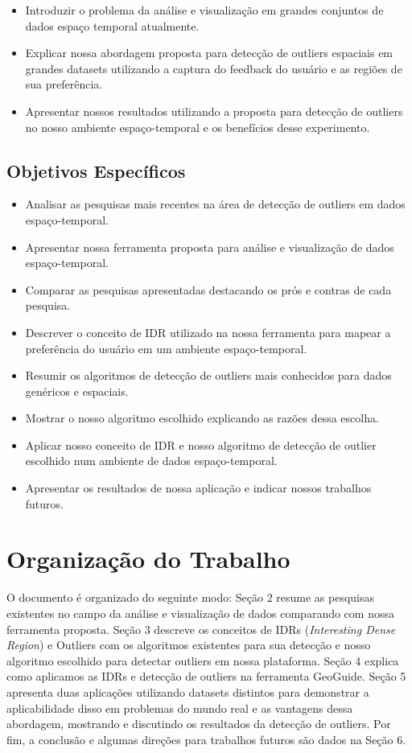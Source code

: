 \begin{itemize}
	\item
	      Introduzir o problema da análise e visualização em grandes conjuntos de dados espaço temporal atualmente.
	\item
	      Explicar nossa abordagem proposta para detecção de outliers espaciais em grandes datasets utilizando a captura do feedback do usuário e as regiões de sua preferência.
	\item
	      Apresentar nossos resultados utilizando a proposta para detecção de outliers no nosso ambiente espaço-temporal e os benefícios desse experimento.

\end{itemize}

\subsection{Objetivos Específicos}

\begin{itemize}
	\item
	      Analisar as pesquisas mais recentes na área de detecção de outliers em dados espaço-temporal.
	\item
	      Apresentar nossa ferramenta proposta para análise e visualização de dados espaço-temporal.
	\item
	      Comparar as pesquisas apresentadas destacando os prós e contras de cada pesquisa.
	\item
	      Descrever o conceito de IDR utilizado na nossa ferramenta para mapear a preferência do usuário em um ambiente espaço-temporal.
	\item
	      Resumir os algoritmos de detecção de outliers mais conhecidos para dados genéricos e espaciais.
	\item
	      Mostrar o nosso algoritmo escolhido explicando as razões dessa escolha.
	\item
	      Aplicar nosso conceito de IDR e nosso algoritmo de detecção de outlier escolhido num ambiente de dados espaço-temporal.
	\item
	      Apresentar os resultados de nossa aplicação e indicar nossos trabalhos futuros.

\end{itemize}

\section{Organização do Trabalho}

O documento é organizado do seguinte modo: Seção 2 resume as pesquisas existentes no campo da análise e visualização de dados comparando com nossa ferramenta proposta. Seção 3 descreve os conceitos de IDRs (\textit{Interesting Dense Region}) e Outliers com os algoritmos existentes para sua detecção e nosso algoritmo escolhido para detectar outliers em nossa plataforma. Seção 4 explica como aplicamos as IDRs e detecção de outliers na ferramenta GeoGuide. Seção 5 apresenta duas aplicações utilizando datasets distintos para demonstrar a aplicabilidade disso em problemas do mundo real e as vantagens dessa abordagem, mostrando e discutindo os resultados da detecção de outliers. Por fim, a conclusão e algumas direções para trabalhos futuros são dados na Seção 6.